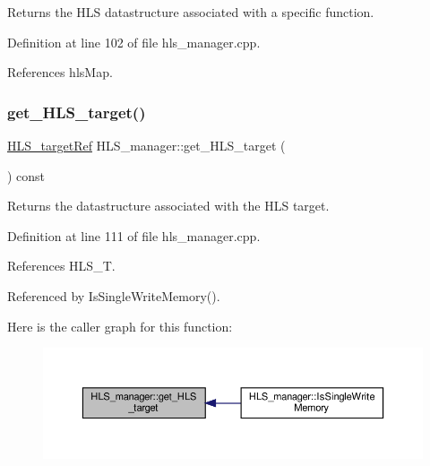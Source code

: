 Returns the H\+LS datastructure associated with a specific function. 



Definition at line 102 of file hls\+\_\+manager.\+cpp.



References hls\+Map.

\mbox{\label{classHLS__manager_a8e61638717813ff15e1a5051815c111e}} 
\subsubsection{\texorpdfstring{get\+\_\+\+H\+L\+S\+\_\+target()}{get\_HLS\_target()}}
{\footnotesize\ttfamily \hyperlink{hls__target_8hpp_a390f1d55d3b31739665ff2776abe2a3f}{H\+L\+S\+\_\+target\+Ref} H\+L\+S\+\_\+manager\+::get\+\_\+\+H\+L\+S\+\_\+target (\begin{DoxyParamCaption}{ }\end{DoxyParamCaption}) const}



Returns the datastructure associated with the H\+LS target. 



Definition at line 111 of file hls\+\_\+manager.\+cpp.



References H\+L\+S\+\_\+T.



Referenced by Is\+Single\+Write\+Memory().

Here is the caller graph for this function\+:
\nopagebreak
\begin{figure}[H]
\begin{center}
\leavevmode
\includegraphics[width=350pt]{dc/dd7/classHLS__manager_a8e61638717813ff15e1a5051815c111e_icgraph}
\end{center}
\end{figure}
\mbox{\label{classHLS__manager_a478b55ce1c14b09a98e3aa266bdde269}} 
